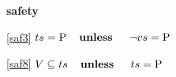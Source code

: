 \textbf{safety}
\begin{block}
\item[ \eqref{saf3} ]$ts = \text{P}  \textbf{\quad unless \quad} \neg vs = \text{P} $ %
\item[ \eqref{saf8} ]$V \subseteq ts  \textbf{\quad unless \quad} ts = \text{P} $ %
\end{block}
